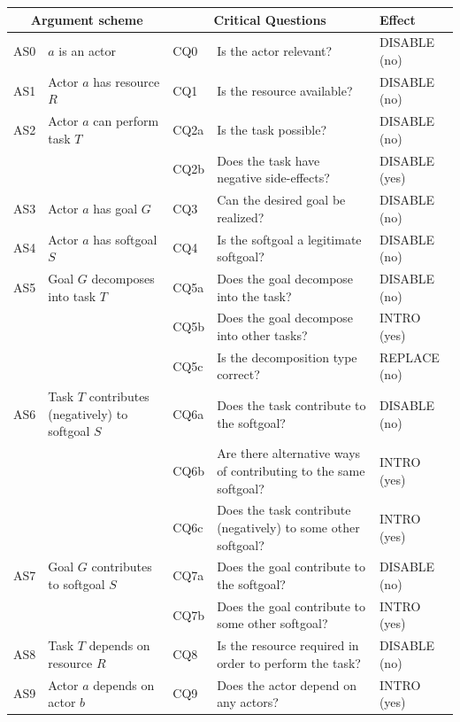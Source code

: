 \begin{table}[t]
\centering
\begin{tabularx}{\textwidth}{|l|l|l|X|l|}
\hline
\multicolumn{2}{|c|}{\textbf{Argument scheme}} & \multicolumn{2}{c|}{\textbf{Critical Questions}} & \textbf{Effect}\\
\hline
AS0 & $a$ is an actor & CQ0 & Is the actor relevant? & \textsf{DISABLE} (no)\\
\hline
AS1 & Actor $a$ has resource $R$ & CQ1 &Is the resource available? & \textsf{DISABLE} (no)\\
\hline
AS2 & Actor $a$ can perform task $T$ & CQ2a &Is the task possible? & \textsf{DISABLE} (no)\\
&& CQ2b & Does the task have negative side-effects? & \textsf{DISABLE} (yes)\\
\hline
AS3 & Actor $a$ has goal $G$ & CQ3 & Can the desired goal be realized? & \textsf{DISABLE} (no)\\
\hline
AS4 & Actor $a$ has softgoal $S$ & CQ4 & Is the softgoal a legitimate softgoal?& \textsf{DISABLE} (no)\\
\hline
\hline
AS5 & Goal $G$ decomposes into task $T$ & CQ5a & Does the goal decompose into the task?& \textsf{DISABLE} (no)\\
& & CQ5b & Does the goal decompose into other tasks? & \textsf{INTRO} (yes)\\
 &  & CQ5c & Is the decomposition type correct? & \textsf{REPLACE} (no)\\
\hline
AS6 & Task $T$ contributes (negatively) to softgoal $S$& CQ6a & Does the task contribute to the softgoal?& \textsf{DISABLE} (no)\\
&& CQ6b & Are there alternative ways of contributing to the same softgoal?& \textsf{INTRO} (yes) \\
&& CQ6c & Does the task contribute (negatively) to some other softgoal?& \textsf{INTRO} (yes)\\
\hline
AS7 & Goal $G$ contributes to softgoal $S$ & CQ7a & Does the goal contribute to the softgoal?& \textsf{DISABLE} (no)\\
&& CQ7b & Does the goal contribute to some other softgoal?& \textsf{INTRO} (yes)\\
\hline
AS8 & Task $T$ depends on resource $R$ & CQ8 & Is the resource required in order to perform the task?& \textsf{DISABLE} (no)\\
\hline
AS9 & Actor $a$ depends on actor $b$ & CQ9 & Does the actor depend on any actors?& \textsf{INTRO} (yes)\\

\end{tabularx}
\end{table}
